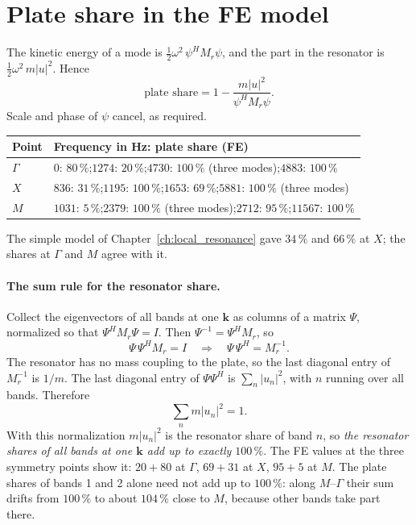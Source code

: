 \section{Plate share in the FE model}

The kinetic energy of a mode is $\tfrac12\omega^2\,\psi^H M_r\psi$, and the part in
the resonator is $\tfrac12\omega^2\, m|u|^2$. Hence
\begin{equation}
  \text{plate share} = 1 - \frac{m|u|^2}{\psi^H M_r \psi} .
\end{equation}
Scale and phase of $\psi$ cancel, as required.

\begin{center}
\begin{tabular}{|l|p{}|}
\hline
Point & Frequency in Hz: plate share (FE) \\
\hline
$\Gamma$ & $0$: $80\,\%$;\quad $1274$: $20\,\%$;\quad $4730$: $100\,\%$ (three modes);\quad $4883$: $100\,\%$ \\
$X$ & $836$: $31\,\%$;\quad $1195$: $100\,\%$;\quad $1653$: $69\,\%$;\quad $5881$: $100\,\%$ (three modes) \\
$M$ & $1031$: $5\,\%$;\quad $2379$: $100\,\%$ (three modes);\quad $2712$: $95\,\%$;\quad $11567$: $100\,\%$ \\
\hline
\end{tabular}
\end{center}

The simple model of Chapter~\ref{ch:local_resonance} gave $34\,\%$ and $66\,\%$ at
$X$; the shares at $\Gamma$ and $M$ agree with it.

\paragraph{The sum rule for the resonator share.}
Collect the eigenvectors of all bands at one $\mathbf{k}$ as columns of a matrix
$\Psi$, normalized so that $\Psi^H M_r \Psi = I$. Then $\Psi^{-1} = \Psi^H M_r$, so
\begin{equation}
  \Psi\,\Psi^H M_r = I \quad\Rightarrow\quad \Psi\,\Psi^H = M_r^{-1} .
\end{equation}
The resonator has no mass coupling to the plate, so the last diagonal entry of
$M_r^{-1}$ is $1/m$. The last diagonal entry of $\Psi\Psi^H$ is $\sum_n |u_n|^2$,
with $n$ running over all bands. Therefore
\begin{equation}
  \sum_n m|u_n|^2 = 1 .
\end{equation}
With this normalization $m|u_n|^2$ is the resonator share of band $n$, so
\emph{the resonator shares of all bands at one $\mathbf{k}$ add up to exactly
$100\,\%$}. The FE values at the three symmetry points show it: $20 + 80$ at
$\Gamma$, $69 + 31$ at $X$, $95 + 5$ at $M$. The plate shares of bands 1 and 2 alone
need not add up to $100\,\%$: along $M$--$\Gamma$ their sum drifts from $100\,\%$ to
about $104\,\%$ close to $M$, because other bands take part there.


